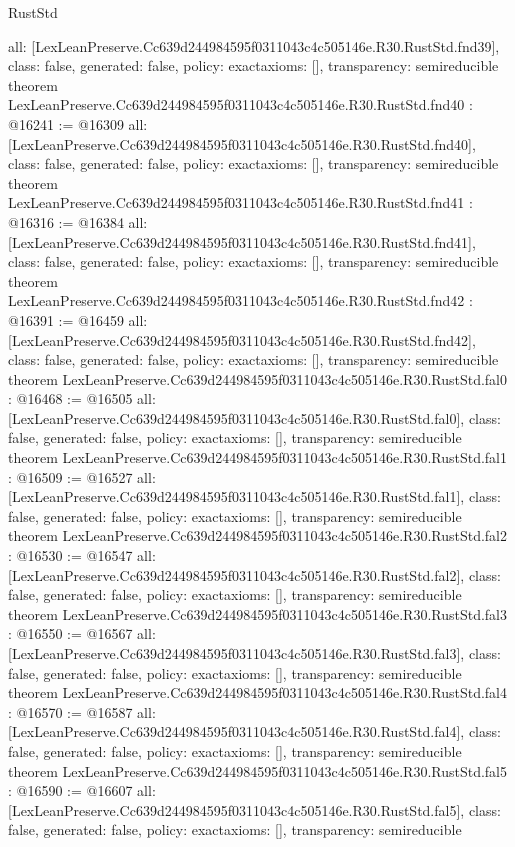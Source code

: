\begin{lexlean}{RustStd}
\begin{coremodule}
{  all: [LexLeanPreserve.Cc639d244984595f0311043c4c505146e.R30.RustStd.fnd39],
  class: false,
  generated: false,
  policy: exact{axioms: []},
  transparency: semireducible
}
theorem LexLeanPreserve.Cc639d244984595f0311043c4c505146e.R30.RustStd.fnd40 : @16241 := @16309 {
  all: [LexLeanPreserve.Cc639d244984595f0311043c4c505146e.R30.RustStd.fnd40],
  class: false,
  generated: false,
  policy: exact{axioms: []},
  transparency: semireducible
}
theorem LexLeanPreserve.Cc639d244984595f0311043c4c505146e.R30.RustStd.fnd41 : @16316 := @16384 {
  all: [LexLeanPreserve.Cc639d244984595f0311043c4c505146e.R30.RustStd.fnd41],
  class: false,
  generated: false,
  policy: exact{axioms: []},
  transparency: semireducible
}
theorem LexLeanPreserve.Cc639d244984595f0311043c4c505146e.R30.RustStd.fnd42 : @16391 := @16459 {
  all: [LexLeanPreserve.Cc639d244984595f0311043c4c505146e.R30.RustStd.fnd42],
  class: false,
  generated: false,
  policy: exact{axioms: []},
  transparency: semireducible
}
theorem LexLeanPreserve.Cc639d244984595f0311043c4c505146e.R30.RustStd.fal0 : @16468 := @16505 {
  all: [LexLeanPreserve.Cc639d244984595f0311043c4c505146e.R30.RustStd.fal0],
  class: false,
  generated: false,
  policy: exact{axioms: []},
  transparency: semireducible
}
theorem LexLeanPreserve.Cc639d244984595f0311043c4c505146e.R30.RustStd.fal1 : @16509 := @16527 {
  all: [LexLeanPreserve.Cc639d244984595f0311043c4c505146e.R30.RustStd.fal1],
  class: false,
  generated: false,
  policy: exact{axioms: []},
  transparency: semireducible
}
theorem LexLeanPreserve.Cc639d244984595f0311043c4c505146e.R30.RustStd.fal2 : @16530 := @16547 {
  all: [LexLeanPreserve.Cc639d244984595f0311043c4c505146e.R30.RustStd.fal2],
  class: false,
  generated: false,
  policy: exact{axioms: []},
  transparency: semireducible
}
theorem LexLeanPreserve.Cc639d244984595f0311043c4c505146e.R30.RustStd.fal3 : @16550 := @16567 {
  all: [LexLeanPreserve.Cc639d244984595f0311043c4c505146e.R30.RustStd.fal3],
  class: false,
  generated: false,
  policy: exact{axioms: []},
  transparency: semireducible
}
theorem LexLeanPreserve.Cc639d244984595f0311043c4c505146e.R30.RustStd.fal4 : @16570 := @16587 {
  all: [LexLeanPreserve.Cc639d244984595f0311043c4c505146e.R30.RustStd.fal4],
  class: false,
  generated: false,
  policy: exact{axioms: []},
  transparency: semireducible
}
theorem LexLeanPreserve.Cc639d244984595f0311043c4c505146e.R30.RustStd.fal5 : @16590 := @16607 {
  all: [LexLeanPreserve.Cc639d244984595f0311043c4c505146e.R30.RustStd.fal5],
  class: false,
  generated: false,
  policy: exact{axioms: []},
  transparency: semireducible
}
\end{coremodule}
\end{lexlean}
